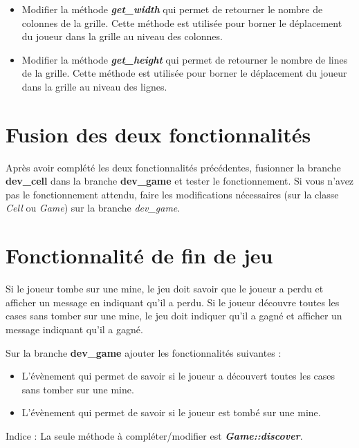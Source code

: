 \medskip

\begin{itemize}
    \item Modifier la méthode \textit{\textbf{get\_width}} qui permet de retourner le nombre de colonnes de la grille. Cette méthode est utilisée pour borner le déplacement du joueur dans la grille au niveau des colonnes.
    \medskip
    \item Modifier la méthode \textit{\textbf{get\_height}} qui permet de retourner le nombre de lines de la grille. Cette méthode est utilisée pour borner le déplacement du joueur dans la grille au niveau des lignes.
\end{itemize}


\medskip

\section{Fusion des deux fonctionnalités}
Après avoir complété les deux fonctionnalités précédentes, fusionner la branche \textbf{dev\_cell} dans la branche \textbf{dev\_game} et tester le fonctionnement. Si vous n'avez pas le fonctionnement attendu, faire les modifications nécessaires (sur la classe \textit{Cell} ou \textit{Game}) sur la branche \textit{dev\_game}.

\section{Fonctionnalité de fin de jeu}
Si le joueur tombe sur une mine, le jeu doit savoir que le joueur a perdu et afficher un message en indiquant qu'il a perdu. Si le joueur découvre toutes les cases sans tomber sur une mine, le jeu doit indiquer qu'il a gagné et afficher un message indiquant qu'il a gagné.

\medskip

Sur la branche \textbf{dev\_game} ajouter les fonctionnalités suivantes : 
\begin{itemize}
    \item L'évènement qui permet de savoir si le joueur a découvert toutes les cases sans tomber sur une mine.
    \item L'évènement qui permet de savoir si le joueur est tombé sur une mine.
\end{itemize}

\medskip

Indice : La seule méthode à compléter/modifier est \textit{\textbf{Game::discover}}.

\medskip

